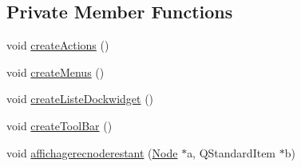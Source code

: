 \subsection*{Private Member Functions}
\begin{DoxyCompactItemize}
\item 
void \hyperlink{class_main_window_a62cd8712fb41a754298f6f60eead2cb0}{create\+Actions} ()
\item 
void \hyperlink{class_main_window_aa4907b0251d305659e403c62921ef331}{create\+Menus} ()
\item 
void \hyperlink{class_main_window_a7b7fd06b9e7bfc83904b1d5b6503e9e9}{create\+Liste\+Dockwidget} ()
\item 
void \hyperlink{class_main_window_aeb57235ebc08860e680132db167c09b4}{create\+Tool\+Bar} ()
\item 
void \hyperlink{class_main_window_a9db31c33ce466950590bb5271412cc86}{affichagerecnoderestant} (\hyperlink{class_node}{Node} $\ast$a, Q\+Standard\+Item $\ast$b)
\end{DoxyCompactItemize}
